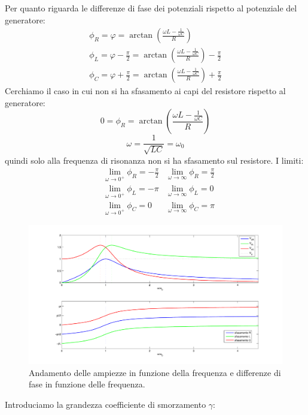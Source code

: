 Per quanto riguarda le differenze di fase dei potenziali rispetto al potenziale del generatore:
\begin{subequations}
\begin{gather}
\phi_R=\varphi=\arctan\left(\frac{\omega L-\frac{1}{\omega C}}{R}\right)\\
\phi_L=\varphi-\frac{\pi}{2}=\arctan\left(\frac{\omega L-\frac{1}{\omega C}}{R}\right)-\frac{\pi}{2}\\
\phi_C=\varphi+\frac{\pi}{2}=\arctan\left(\frac{\omega L-\frac{1}{\omega C}}{R}\right)+\frac{\pi}{2}
\end{gather}
\end{subequations}
Cerchiamo il caso in cui non si ha sfasamento ai capi del resistore rispetto al generatore:
\[
0=\phi_R=\arctan\left(\frac{\omega L-\frac{1}{\omega C}}{R}\right)
\]
\begin{equation}
\omega=\frac{1}{\sqrt{LC}}=\omega_0
\end{equation}
quindi solo alla frequenza di risonanza non si ha sfasamento sul resistore. I limiti:
\begin{subequations}
\begin{align}
&\lim_{\omega\to 0^+}\phi_R=-\frac{\pi}{2}&\lim_{\omega\to\infty}\phi_R=\frac{\pi}{2}\\
&\lim_{\omega\to 0^+}\phi_L=-\pi&\lim_{\omega\to\infty}\phi_L=0\\
&\lim_{\omega\to 0^+}\phi_C=0&\lim_{\omega\to\infty}\phi_C=\pi
\end{align}
\end{subequations}
\begin{figure}[htbp]
\centering
\includegraphics[scale=0.45]{immagini/fisica2/RLC_01}
\caption{Andamento delle ampiezze in funzione della frequenza e differenze di fase in funzione delle frequenza.}
\end{figure}
Introduciamo la grandezza coefficiente di smorzamento $\gamma$:
